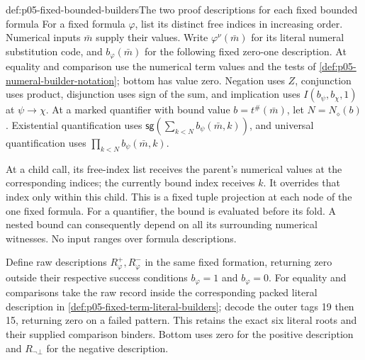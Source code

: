 \begin{hbdefinition}{def:p05-fixed-bounded-builders}{The two proof descriptions for each fixed bounded formula}
For a fixed formula \(\varphi\), list its distinct free indices in
increasing order. Numerical inputs \(\bar m\) supply their values.
Write \(\varphi^\nu(\bar m)\) for its literal numeral substitution
code, and \(b_\varphi(\bar m)\) for the following fixed zero-one
description. At equality and comparison use the numerical term values and
the tests of \cref{def:p05-numeral-builder-notation}; bottom has value
zero. Negation uses \(Z\), conjunction uses product, disjunction uses
sign of the sum, and implication uses
\(I(b_\psi,b_\chi,1)\) at \(\psi\to\chi\).
At a marked quantifier with bound value \(b=t^\#(\bar m)\), let
\(N=N_\diamond(b)\). Existential quantification uses
\(\mathsf{sg}(\sum_{k<N}b_\psi(\bar m,k))\), and universal
quantification uses \(\prod_{k<N}b_\psi(\bar m,k)\).

At a child call, its free-index list receives the parent's numerical values
at the corresponding indices; the currently bound index receives \(k\).
It overrides that index only within this child. This is a fixed tuple
projection at each node of the one fixed formula. For a quantifier, the
bound is evaluated before its fold. A nested bound can consequently depend
on all its surrounding numerical witnesses. No input ranges over formula
descriptions.

Define raw descriptions \(R_\varphi^+,R_\varphi^-\) in the same fixed
formation, returning zero outside their respective success conditions
\(b_\varphi=1\) and \(b_\varphi=0\). For equality and comparisons
take the raw record inside the corresponding packed literal description in
\cref{def:p05-fixed-term-literal-builders}; decode the outer tags 19 then
15, returning zero on a failed pattern. This retains the exact six literal
roots and their supplied comparison binders. Bottom uses zero for the
positive description and \(R_{\neg\bot}\) for the negative description.


\end{hbdefinition}
